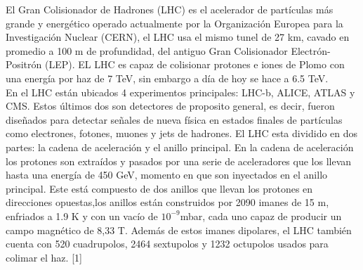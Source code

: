 El Gran Colisionador de Hadrones (LHC) es el acelerador de partículas más grande y energético operado actualmente por la Organización Europea para la Investigación Nuclear (CERN), el LHC usa el mismo tunel de 27 km, cavado en promedio a 100 m de profundidad, del antiguo Gran Colisionador Electrón-Positrón (LEP). EL LHC es capaz de colisionar protones e iones de Plomo con una energía por haz de 7 TeV, sin embargo a día de hoy se hace a 6.5 TeV.
\\

En el LHC están ubicados 4 experimentos principales: LHC-b, ALICE, ATLAS y CMS. Estos últimos dos son detectores de proposito general, es decir, fueron diseñados para detectar señales de nueva física en estados finales de partículas como electrones, fotones, muones y jets de hadrones. El LHC esta dividido en dos partes: la cadena de aceleración y el anillo principal. En la cadena de aceleración los protones son extraídos y pasados por una serie de aceleradores que los llevan hasta una energía de 450 GeV, momento en que son inyectados en el anillo principal. Este está compuesto de dos anillos que llevan los protones en direcciones opuestas,los anillos están construidos por 2090 imanes de 15 m, enfriados a 1.9 K y con un vacío de $10^{-9}$mbar, cada uno capaz de producir un campo magnético de 8,33 T. Además de estos imanes dipolares, el LHC también cuenta con 520 cuadrupolos, 2464 sextupolos y 1232 octupolos usados para colimar el haz. [1]
\\
\\

